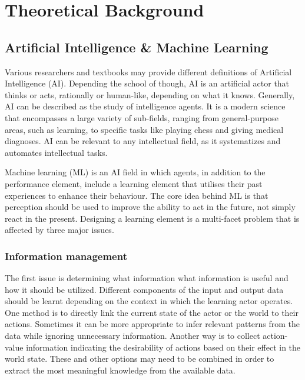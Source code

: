 \chapter{Theoretical Background}
\label{Chapter-Theoretical-Background}

\section{Artificial Intelligence \& Machine Learning}

Various researchers and textbooks may provide different definitions of Artificial Intelligence (AI). Depending the school of though, AI is an artificial actor that thinks or acts, rationally or human-like, depending on what it knows. Generally, AI can be described as the study of intelligence agents. It is a modern science that encompasses a large variety of sub-fields, ranging from general-purpose areas, such as learning, to specific tasks like playing chess and giving medical diagnoses. AI can be relevant to any intellectual field, as it systematizes and automates intellectual tasks. \cite{russell_norvig_2003_1}

Machine learning (ML) is an AI field in which agents, in addition to the performance element, include a learning element that utilises their past experiences to enhance their behaviour. The core idea behind ML is that perception should be used to improve the ability to act in the future, not simply react in the present. Designing a learning element is a multi-facet problem that is affected by three major issues. \cite{russell_norvig_2003_18}

\subsection*{Information management}%
The first issue is determining what information what information is useful and how it should be utilized. Different components of the input and output data should be learnt depending on the context in which the learning actor operates. One method is to directly link the current state of the actor or the world to their actions. Sometimes it can be more appropriate to infer relevant patterns from the data while ignoring unnecessary information. Another way is to collect action-value information indicating the desirability of actions based on their effect in the world state. These and other options may need to be combined in order to extract the most meaningful knowledge from the available data.

